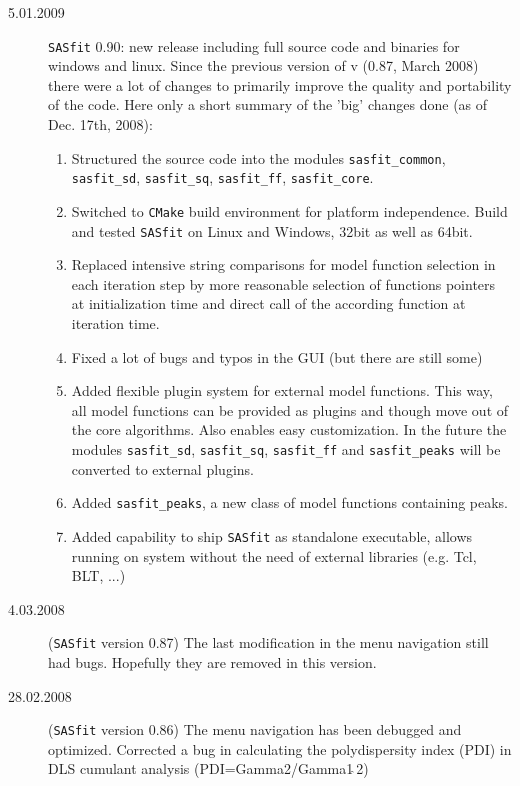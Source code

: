 \begin{description}
    \item[5.01.2009] {\tt SASfit} 0.90:
    new release including full source code and binaries for
    windows and linux. Since the previous version of v (0.87, March 2008)
    there were a lot of changes to primarily improve the quality
    and portability of the code. Here only a short summary of the 'big'
    changes done (as of Dec. 17th, 2008):
    \begin{enumerate}
        \item Structured the source code into the modules \texttt{sasfit\_common}, \texttt{sasfit\_sd}, \texttt{sasfit\_sq},
                \texttt{sasfit\_ff}, \texttt{sasfit\_core}.
        \item Switched to {\tt CMake} build environment for platform independence. Build and tested {\tt SASfit} on
                Linux and Windows, 32bit as well as 64bit.
        \item Replaced intensive string comparisons for model function selection in each iteration step by more reasonable
                selection of functions pointers at initialization time and direct call of the according function at iteration time.
        \item Fixed a lot of bugs and typos in the GUI (but there are still some)
        \item Added flexible plugin system for external model functions. This way, all model functions can be provided
                as plugins and though move out of the core algorithms. Also enables easy customization. In the future
                the modules \texttt{sasfit\_sd}, \texttt{sasfit\_sq}, \texttt{sasfit\_ff} and \texttt{sasfit\_peaks}
                will be converted to external plugins.
        \item Added \texttt{sasfit\_peaks}, a new class of model functions containing peaks.
        \item Added capability to ship {\tt SASfit} as standalone executable, allows running on system without the
                need of external libraries (e.g. Tcl, BLT, ...)
    \end{enumerate}
    \item[4.03.2008] ({\tt SASfit} version 0.87) The last
    modification in the menu navigation still had bugs. Hopefully
    they are removed in this version.
    \item[28.02.2008] ({\tt SASfit} version 0.86)
    The menu navigation has been debugged and optimized.
    Corrected a bug in calculating the polydispersity index (PDI)
    in DLS cumulant analysis (PDI=Gamma2/Gamma1$\hat{~}$2)

\end{description}
